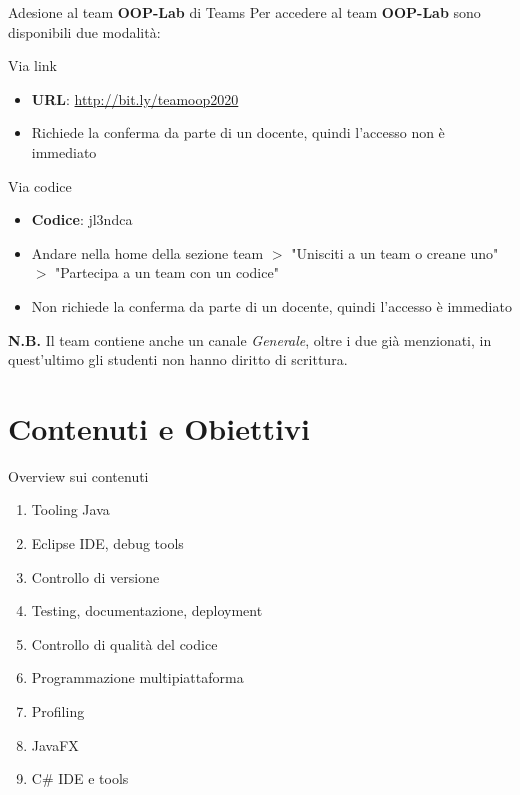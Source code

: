 \documentclass[xcolor=dvipsnames,presentation]{beamer}
\begin{document}
\begin{frame}{Adesione al team \textbf{OOP-Lab} di Teams}
    Per accedere al team \textbf{OOP-Lab} sono disponibili due modalità:
    \begin{block}{Via link}
        \begin{itemize}
            \item \textbf{URL}: \url{http://bit.ly/teamoop2020}
            \item Richiede la conferma da parte di un docente, quindi l'accesso non è immediato
        \end{itemize}
    \end{block}
    \begin{block}{Via codice}
        \begin{itemize}
            \item \textbf{Codice}: jl3ndca
            \item Andare nella home della sezione team $>$ "Unisciti a un team o creane uno" $>$ "Partecipa a un team con un codice"
	    \item Non richiede la conferma da parte di un docente, quindi l'accesso è immediato
        \end{itemize}
    \end{block}
    \textbf{N.B.} Il team contiene anche un canale \textit{Generale}, oltre i due già menzionati, in quest'ultimo gli studenti non hanno diritto di scrittura.
\end{frame}


\section{Contenuti e Obiettivi}

\begin{frame}{Overview sui contenuti}

\begin{enumerate}
    \item Tooling Java
    \item Eclipse IDE, debug tools
    \item Controllo di versione
    \item Testing, documentazione, deployment
    \item Controllo di qualità del codice
    \item Programmazione multipiattaforma
    \item Profiling
    \item JavaFX
    \item C\# IDE e tools
\end{enumerate}

\end{frame}
\end{document}
